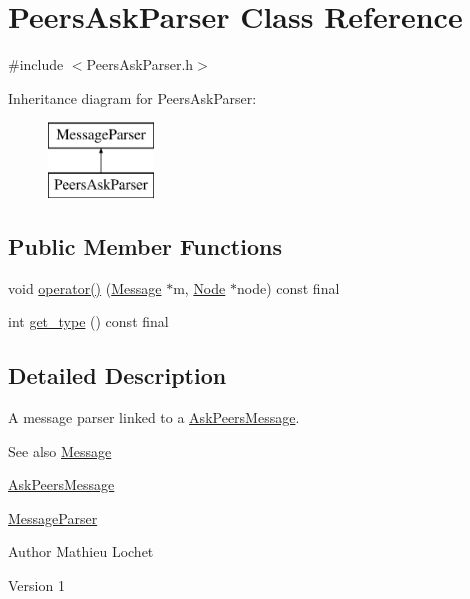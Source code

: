 \hypertarget{classPeersAskParser}{}\section{Peers\+Ask\+Parser Class Reference}
\label{classPeersAskParser}


{\ttfamily \#include $<$Peers\+Ask\+Parser.\+h$>$}

Inheritance diagram for Peers\+Ask\+Parser\+:\begin{figure}[H]
\begin{center}
\leavevmode
\includegraphics[height=2.000000cm]{classPeersAskParser}
\end{center}
\end{figure}
\subsection*{Public Member Functions}
\begin{DoxyCompactItemize}
\item 
void \mbox{\hyperlink{classPeersAskParser_ac52c9f42fa449029d49faaf9255b2d0d}{operator()}} (\mbox{\hyperlink{classMessage}{Message}} $\ast$m, \mbox{\hyperlink{classNode}{Node}} $\ast$node) const final
\item 
int \mbox{\hyperlink{classPeersAskParser_abda1a00fdca208592d3f7e7b039f9ba7}{get\+\_\+type}} () const final
\end{DoxyCompactItemize}


\subsection{Detailed Description}
A message parser linked to a \mbox{\hyperlink{classAskPeersMessage}{Ask\+Peers\+Message}}. \begin{DoxySeeAlso}{See also}
\mbox{\hyperlink{classMessage}{Message}} 

\mbox{\hyperlink{classAskPeersMessage}{Ask\+Peers\+Message}} 

\mbox{\hyperlink{classMessageParser}{Message\+Parser}}
\end{DoxySeeAlso}
\begin{DoxyAuthor}{Author}
Mathieu Lochet 
\end{DoxyAuthor}
\begin{DoxyVersion}{Version}
1 
\end{DoxyVersion}


